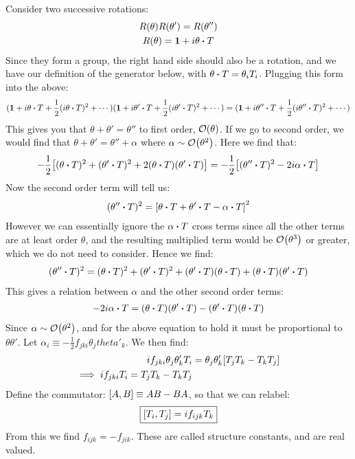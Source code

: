 Consider two successive rotations:
\begin{gather*}
  R(\theta)R(\theta')=R(\theta'')\\
  R(\theta)=\bm{1}+i\theta\vdot T
\end{gather*}
Since they form a group, the right hand side should also be a rotation, and we have our definition of the generator below, with $\theta\vdot T=\theta_iT_i$. Plugging this form into the above:
\begin{align*}
  (\bm{1}+i\theta\vdot T+\frac12(i\theta\vdot T)^2+\cdots)
  (\bm{1}+i\theta'\vdot T+\frac12(i\theta'\vdot T)^2+\cdots)=
  (\bm{1}+i\theta''\vdot T+\frac12(i\theta''\vdot T)^2+\cdots)
\end{align*}
This gives you that $\theta+\theta'=\theta''$ to first order, $\order{\theta}$. If we go to second order, we would find that $\theta+\theta'=\theta''+\alpha$ where $\alpha\sim\order{\theta^2}$. Here we find that:
\begin{align*}
  -\frac12\qty[(\theta\vdot T)^2+(\theta'\vdot T)^2+2(\theta\vdot T)(\theta'\vdot T)]=-\frac12\qty[(\theta''\vdot T)^2-2i\alpha\vdot T]
\end{align*}
Now the second order term will tell us:
\begin{align*}
  (\theta''\vdot T)^2=\qty[\theta\vdot T+\theta'\vdot T-\alpha\vdot T]^2
\end{align*}
However we can essentially ignore the $\alpha\vdot T$ cross terms since all the other terms are at least order $\theta$, and the resulting multiplied term would be $\order{\theta^3}$ or greater, which we do not need to consider. Hence we find:
\begin{align*}
  (\theta''\vdot T)^2=(\theta\vdot T)^2+(\theta'\vdot T)^2+(\theta'\vdot T)(\theta\vdot T)+(\theta\vdot T)(\theta'\vdot T)
\end{align*}
This gives a relation between $\alpha$ and the other second order terms:
\begin{align*}
  -2i\alpha\vdot T=
  (\theta\vdot T)(\theta'\vdot T)-(\theta'\vdot T)(\theta\vdot T)
\end{align*}
Since $\alpha\sim\order{\theta^2}$, and for the above equation to hold it must be proportional to $\theta\theta'$. Let $\alpha_i\equiv-\frac12f_{jki}\theta_jtheta'_k$. We then find:
\begin{align*}
  if_{jki}\theta_j\theta'_kT_i&=\theta_j\theta'_k\qty[T_jT_k-T_kT_j]\\
  \implies if_{jki}T_i=T_jT_k-T_kT_j
\end{align*}
Define the commutator: $\comm{A}{B}\equiv AB-BA$, so that we can relabel:
\begin{align*}
  \boxed{\comm{T_i}{T_j}=if_{ijk}T_k}
\end{align*}
From this we find $f_{ijk}=-f_{jik}$. These are called structure constants, and are real valued.

